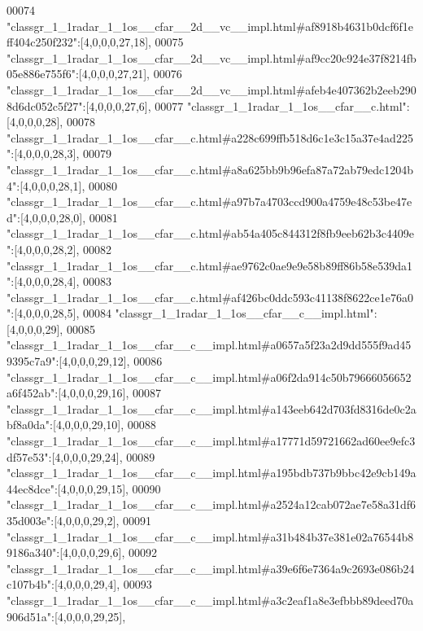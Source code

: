 \begin{DoxyCode}
00074 \textcolor{stringliteral}{"classgr\_1\_1radar\_1\_1os\_\_cfar\_\_2d\_\_vc\_\_impl.html#af8918b4631b0dcf6f1eff404c250f232"}:[4,0,0,0,27,18],
00075 \textcolor{stringliteral}{"classgr\_1\_1radar\_1\_1os\_\_cfar\_\_2d\_\_vc\_\_impl.html#af9cc20c924e37f8214fb05e886e755f6"}:[4,0,0,0,27,21],
00076 \textcolor{stringliteral}{"classgr\_1\_1radar\_1\_1os\_\_cfar\_\_2d\_\_vc\_\_impl.html#afeb4e407362b2eeb2908d6dc052c5f27"}:[4,0,0,0,27,6],
00077 \textcolor{stringliteral}{"classgr\_1\_1radar\_1\_1os\_\_cfar\_\_c.html"}:[4,0,0,0,28],
00078 \textcolor{stringliteral}{"classgr\_1\_1radar\_1\_1os\_\_cfar\_\_c.html#a228c699ffb518d6c1e3c15a37e4ad225"}:[4,0,0,0,28,3],
00079 \textcolor{stringliteral}{"classgr\_1\_1radar\_1\_1os\_\_cfar\_\_c.html#a8a625bb9b96efa87a72ab79edc1204b4"}:[4,0,0,0,28,1],
00080 \textcolor{stringliteral}{"classgr\_1\_1radar\_1\_1os\_\_cfar\_\_c.html#a97b7a4703ccd900a4759e48c53be47ed"}:[4,0,0,0,28,0],
00081 \textcolor{stringliteral}{"classgr\_1\_1radar\_1\_1os\_\_cfar\_\_c.html#ab54a405c844312f8fb9eeb62b3c4409e"}:[4,0,0,0,28,2],
00082 \textcolor{stringliteral}{"classgr\_1\_1radar\_1\_1os\_\_cfar\_\_c.html#ae9762c0ae9e9e58b89ff86b58e539da1"}:[4,0,0,0,28,4],
00083 \textcolor{stringliteral}{"classgr\_1\_1radar\_1\_1os\_\_cfar\_\_c.html#af426bc0ddc593c41138f8622ce1e76a0"}:[4,0,0,0,28,5],
00084 \textcolor{stringliteral}{"classgr\_1\_1radar\_1\_1os\_\_cfar\_\_c\_\_impl.html"}:[4,0,0,0,29],
00085 \textcolor{stringliteral}{"classgr\_1\_1radar\_1\_1os\_\_cfar\_\_c\_\_impl.html#a0657a5f23a2d9dd555f9ad459395c7a9"}:[4,0,0,0,29,12],
00086 \textcolor{stringliteral}{"classgr\_1\_1radar\_1\_1os\_\_cfar\_\_c\_\_impl.html#a06f2da914c50b79666056652a6f452ab"}:[4,0,0,0,29,16],
00087 \textcolor{stringliteral}{"classgr\_1\_1radar\_1\_1os\_\_cfar\_\_c\_\_impl.html#a143eeb642d703fd8316de0c2abf8a0da"}:[4,0,0,0,29,10],
00088 \textcolor{stringliteral}{"classgr\_1\_1radar\_1\_1os\_\_cfar\_\_c\_\_impl.html#a17771d59721662ad60ee9efc3df57e53"}:[4,0,0,0,29,24],
00089 \textcolor{stringliteral}{"classgr\_1\_1radar\_1\_1os\_\_cfar\_\_c\_\_impl.html#a195bdb737b9bbc42e9cb149a44ec8dce"}:[4,0,0,0,29,15],
00090 \textcolor{stringliteral}{"classgr\_1\_1radar\_1\_1os\_\_cfar\_\_c\_\_impl.html#a2524a12cab072ae7e58a31df635d003e"}:[4,0,0,0,29,2],
00091 \textcolor{stringliteral}{"classgr\_1\_1radar\_1\_1os\_\_cfar\_\_c\_\_impl.html#a31b484b37e381e02a76544b89186a340"}:[4,0,0,0,29,6],
00092 \textcolor{stringliteral}{"classgr\_1\_1radar\_1\_1os\_\_cfar\_\_c\_\_impl.html#a39e6f6e7364a9c2693e086b24c107b4b"}:[4,0,0,0,29,4],
00093 \textcolor{stringliteral}{"classgr\_1\_1radar\_1\_1os\_\_cfar\_\_c\_\_impl.html#a3c2eaf1a8e3efbbb89deed70a906d51a"}:[4,0,0,0,29,25],

\end{DoxyCode}
